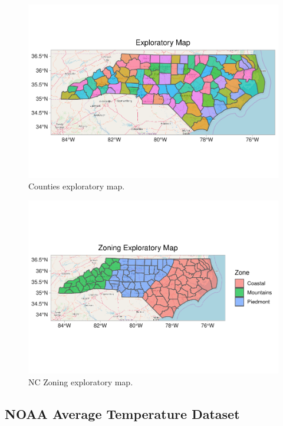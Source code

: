 \documentclass[12pt,]{article}
\begin{document}
\begin{figure}
\centering
\includegraphics{Raby_ENV872_Project_files/figure-latex/unnamed-chunk-23-1.pdf}
\caption{Counties exploratory map. \label{Countyplot}}
\end{figure}

\begin{figure}
\centering
\includegraphics{Raby_ENV872_Project_files/figure-latex/unnamed-chunk-24-1.pdf}
\caption{NC Zoning exploratory map. \label{Zoneplot}}
\end{figure}

\subsection{NOAA Average Temperature
Dataset}\label{noaa-average-temperature-dataset-1}
\end{document}
